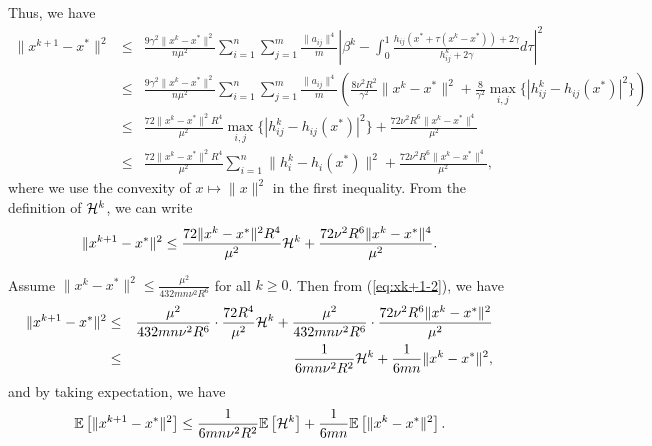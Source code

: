 \documentclass[10pt]{article}
\newcommand{\ExpBr}[1]{\mathbb{E}\left[#1\right]}
\newcommand{\newalpha}{h}
\begin{document}
Thus, we have 
\begin{eqnarray}
\|x^{k+1} - x^*\|^2 &\leq& \frac{9\gamma^2\|x^k - x^*\|^2}{n \mu^2} \sum_{i=1}^n \sum_{j=1}^{m} \frac{\|a_{ij}\|^4}{m} \left|   \beta^k - \int_{0}^1 \frac{\newalpha_{ij}(x^* + \tau(x^k - x^*)) + 2\gamma}{ h_{ij}^k + 2\gamma} d\tau   \right|^2 \nonumber \\ 
&\leq& \frac{9\gamma^2\|x^k - x^*\|^2}{n \mu^2} \sum_{i=1}^n \sum_{j=1}^{m} \frac{\|a_{ij}\|^4}{m} \left(  \frac{8\nu^2 R^2}{\gamma^2} \|x^k - x^*\|^2 + \frac{8}{\gamma^2} \max_{i, j} \{|h_{ij}^k - \newalpha_{ij}(x^*)|^2 \}    \right) \nonumber \\ 
&\leq& \frac{72\|x^k - x^*\|^2 R^4}{\mu^2} \max_{i, j} \{|h_{ij}^k - \newalpha_{ij}(x^*)|^2 \}  +   \frac{72\nu^2 R^6\|x^k - x^*\|^4 }{\mu^2} \label{eq:forinitiallm} \\ 
&\leq&  \frac{72\|x^k - x^*\|^2 R^4}{\mu^2} \sum_{i=1}^n \|h_i^k - \newalpha_i(x^*)\|^2 +   \frac{72\nu^2 R^6\|x^k - x^*\|^4 }{\mu^2}, \nonumber 
\end{eqnarray}
where we use the convexity of $x\mapsto \|x\|^2$ in the first inequality. From the definition of ${\cal H}^k$, we can write 
\begin{equation}\label{eq:xk+1-2}
\|x^{k+1} - x^*\|^2 \leq  \frac{72\|x^k - x^*\|^2 R^4}{\mu^2} {\cal H}^k +   \frac{72\nu^2 R^6\|x^k - x^*\|^4 }{\mu^2}. 
\end{equation}


Assume $\|x^k - x^*\|^2 \leq \frac{\mu^2}{432m n \nu^2R^6}$ for all $k\geq 0$. Then from (\ref{eq:xk+1-2}), we have 
\begin{eqnarray*}
	\|x^{k+1} - x^*\|^2 &\leq& \frac{\mu^2}{432 mn\nu^2 R^6} \cdot \frac{72R^4}{\mu^2}{\cal H}^k + \frac{\mu^2}{432mn\nu^2 R^6} \cdot \frac{ 72\nu^2 R^6\|x^k-x^*\|^2}{\mu^2} \\ 
	&\leq& \frac{1}{6mn \nu^2 R^2} {\cal H}^k + \frac{1}{6mn} \|x^k - x^*\|^2, 
\end{eqnarray*}
and by taking expectation, we have 
\begin{equation}\label{eq:expxk+1-2}
\ExpBr{\|x^{k+1} - x^*\|^2} \leq  \frac{1}{6mn \nu^2 R^2} \ExpBr{{\cal H}^k} + \frac{1}{6mn} \ExpBr{ \|x^k - x^*\|^2}. 
\end{equation}
\end{document}
